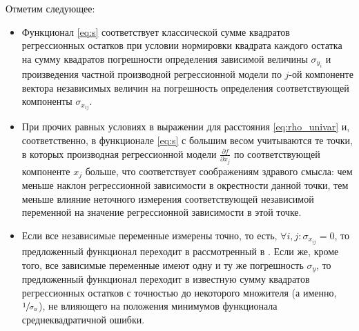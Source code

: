 \documentclass[tikz,10pt,a4paper]{article}
\begin{document}
Отметим следующее:
\begin{itemize}
  \item Функционал \eqref{eq:s} соответствует классической сумме квадратов регрессионных
	остатков при условии нормировки квадрата каждого остатка на сумму квадратов погрешности
	определения зависимой величины $\sigma_{y_i}$ и произведения частной производной
	регрессионной модели по $j$-ой компоненте вектора независимых величин на погрешность
	определения соответствующей компоненты $\sigma_{x_{ij}}$.

  \item При прочих равных условиях в выражении для расстояния \eqref{eq:rho_univar} и,
	соответственно, в функционале \eqref{eq:s} с большим весом учитываются те точки, в которых
	производная регрессионной модели $\frac{\partial f}{\partial x_j}$ по соответствующей
	компоненте $x_j$ больше, что соответствует соображениям здравого смысла: чем меньше наклон
	регрессионной зависимости в окрестности данной точки, тем меньше влияние неточного
	измерения соответствующей независимой переменной на значение регрессионной зависимости
	в этой точке.

  \item Если все независимые переменные измерены точно, то есть,
	$\forall i, j : \sigma_{x_{ij}} = 0$, то предложенный функционал переходит в рассмотренный
	в \cite{jukic2013nonlinear}. Если же, кроме того, все зависимые переменные имеют одну и ту
	же погрешность $\sigma_y$,
	то предложенный функционал переходит в известную сумму квадратов регрессионных остатков
	с точностью до некоторого множителя (а именно, $\sfrac{1}{\sigma_y}$), не влияющего на
	положения минимумов функционала среднеквадратичной ошибки.
\end{itemize}
\end{document}
